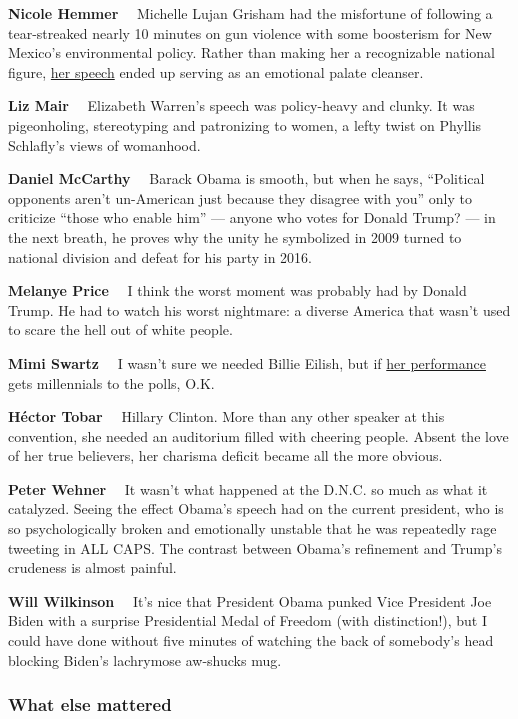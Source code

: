 \textbf{Nicole Hemmer}~~ Michelle Lujan Grisham had the misfortune of
following a tear-streaked nearly 10 minutes on gun violence with some
boosterism for New Mexico's environmental policy. Rather than making her
a recognizable national figure,
\href{https://www.youtube.com/watch?v=rztcI-DFFQA}{her speech} ended up
serving as an emotional palate cleanser.

\textbf{Liz Mair}~~ Elizabeth Warren's speech was policy-heavy and
clunky. It was pigeonholing, stereotyping and patronizing to women, a
lefty twist on Phyllis Schlafly's views of womanhood.

\textbf{Daniel McCarthy}~~ Barack Obama is smooth, but when he says,
``Political opponents aren't un-American just because they disagree with
you'' only to criticize ``those who enable him'' --- anyone who votes
for Donald Trump? --- in the next breath, he proves why the unity he
symbolized in 2009 turned to national division and defeat for his party
in 2016.

\textbf{Melanye Price}~~ I think the worst moment was probably had by
Donald Trump. He had to watch his worst nightmare: a diverse America
that wasn't used to scare the hell out of white people.

\textbf{Mimi Swartz}~~ I wasn't sure we needed Billie Eilish, but if
\href{https://www.youtube.com/watch?v=sly78aDTjFo}{her performance} gets
millennials to the polls, O.K.

\textbf{Héctor Tobar}~~ Hillary Clinton. More than any other speaker at
this convention, she needed an auditorium filled with cheering people.
Absent the love of her true believers, her charisma deficit became all
the more obvious.

\textbf{Peter Wehner}~~ It wasn't what happened at the D.N.C. so much as
what it catalyzed. Seeing the effect Obama's speech had on the current
president, who is so psychologically broken and emotionally unstable
that he was repeatedly rage tweeting in ALL CAPS. The contrast between
Obama's refinement and Trump's crudeness is almost painful.

\textbf{Will Wilkinson}~~ It's nice that President Obama punked Vice
President Joe Biden with a surprise Presidential Medal of Freedom (with
distinction!), but I could have done without five minutes of watching
the back of somebody's head blocking Biden's lachrymose aw-shucks mug.

\hypertarget{what-else-mattered}{%
\subsubsection{What else mattered}\label{what-else-mattered}}

